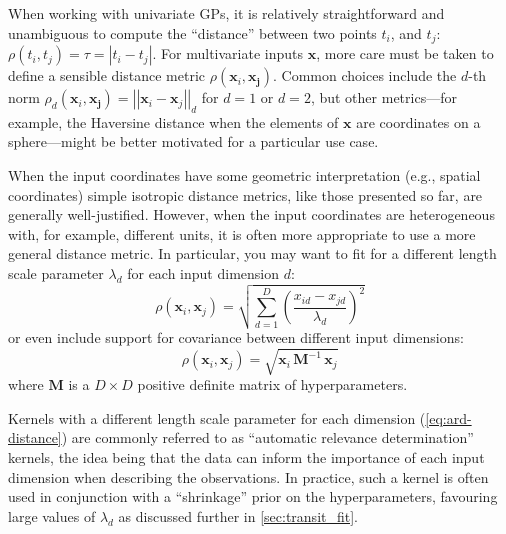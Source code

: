\documentclass[letterpaper]{ar-1col}
\newcommand{\dt}{\ensuremath{\tau}}
\newcommand{\lengthscale}{\ensuremath{\lambda}}
\begin{document}
When working with univariate GPs, it is relatively straightforward and unambiguous to compute the ``distance'' between two points $t_i$, and $t_j$: $\rho(t_i,t_j) = \dt = \left|t_i - t_j\right|$.
For multivariate inputs $\boldsymbol{x}$, more care must be taken to define a sensible distance metric $\rho(\boldsymbol{x}_i,\boldsymbol{x_j})$.
Common choices include the $d$-th norm $\rho_d(\boldsymbol{x}_i,\boldsymbol{x_j}) = \left|\left|\boldsymbol{x}_i - \boldsymbol{x}_j\right|\right|_d$ for $d=1$ or $d=2$, but other metrics---for example, the Haversine distance when the elements of $\boldsymbol{x}$ are coordinates on a sphere---might be better motivated for a particular use case.

When the input coordinates have some geometric interpretation (e.g., spatial coordinates) simple isotropic distance metrics, like those presented so far, are generally well-justified.
However, when the input coordinates are heterogeneous with, for example, different units, it is often more appropriate to use a more general distance metric.
In particular, you may want to fit for a different length scale parameter $\lengthscale_d$ for each input dimension $d$:
\begin{equation}\label{eq:ard-distance}
  \rho(\boldsymbol{x}_i,\boldsymbol{x}_j) = \sqrt{\sum_{d=1}^D \left(\frac{x_{id} - x_{jd}}{\lengthscale_d}\right)^2}
\end{equation}
or even include support for covariance between different input dimensions:
\begin{equation}
  \rho(\boldsymbol{x}_i,\boldsymbol{x}_j) = \sqrt{\boldsymbol{x}_i\,\boldsymbol{M}^{-1}\,\boldsymbol{x}_j}
\end{equation}
where $\boldsymbol{M}$ is a $D\times D$ positive definite matrix of hyperparameters.

Kernels with a different length scale parameter for each dimension (\autoref{eq:ard-distance}) are commonly referred to as ``automatic relevance determination'' \citep[ARD;][]{gpml} kernels, the idea being that the data can inform the importance of each input dimension when describing the observations.
In practice, such a kernel is often used in conjunction with a ``shrinkage'' prior on the hyperparameters, favouring large values of $\lengthscale_d$ as discussed further in \autoref{sec:transit_fit}.
\begin{armarginnote}[]
\end{armarginnote}
\end{document}
